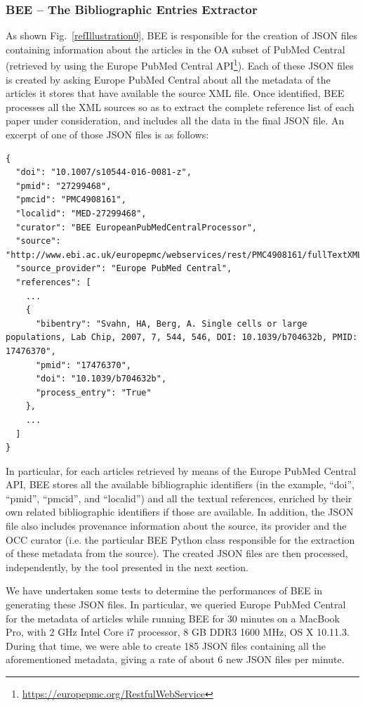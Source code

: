 \documentclass[runningheads,a4paper]{llncs}
\begin{document}
\subsubsection{BEE -- The Bibliographic Entries Extractor}\label{__RefHeading__11281_1890349413}

As shown Fig.~\ref{refIllustration0}, BEE is responsible for the creation of JSON files containing information about the articles in the OA subset of PubMed Central (retrieved by using the Europe PubMed Central API\footnote{\url{https://europepmc.org/RestfulWebService}}). Each of these JSON files is created by asking Europe PubMed Central about all the metadata of the articles it stores that have available the source XML file. Once identified, BEE processes all the XML sources so as to extract the complete reference list of each paper under consideration, and includes all the data in the final JSON file. An excerpt of one of those JSON files is as follows:

\begin{lstlisting}[mathescape]
{
  "doi": "10.1007/s10544-016-0081-z", 
  "pmid": "27299468", 
  "pmcid": "PMC4908161",
  "localid": "MED-27299468", 
  "curator": "BEE EuropeanPubMedCentralProcessor", 
  "source": "http://www.ebi.ac.uk/europepmc/webservices/rest/PMC4908161/fullTextXML", 
  "source_provider": "Europe PubMed Central", 
  "references": [
    ... 
    {
      "bibentry": "Svahn, HA, Berg, A. Single cells or large populations, Lab Chip, 2007, 7, 544, 546, DOI: 10.1039/b704632b, PMID: 17476370", 
      "pmid": "17476370", 
      "doi": "10.1039/b704632b", 
      "process_entry": "True"
    },
    ...
  ] 
}
\end{lstlisting}

In particular, for each articles retrieved by means of the Europe PubMed Central API, BEE stores all the available bibliographic identifiers (in the example, ``doi'', ``pmid'', ``pmcid'', and ``localid'') and all the textual references, enriched by their own related bibliographic identifiers if those are available. In addition, the JSON file also includes provenance information about the source, its provider and the OCC curator (i.e. the particular BEE Python class responsible for the extraction of these metadata from the source). The created JSON files are then processed, independently, by the tool presented in the next section.

We have undertaken some tests to determine the performances of BEE in generating these JSON files. In particular, we queried Europe PubMed Central for the metadata of articles while running BEE for 30 minutes on a MacBook Pro, with 2 GHz Intel Core i7 processor, 8 GB DDR3 1600 MHz, OS X 10.11.3. During that time, we were able to create 185 JSON files containing all the aforementioned metadata, giving a rate of about 6 new JSON files per minute. 
\end{document}
